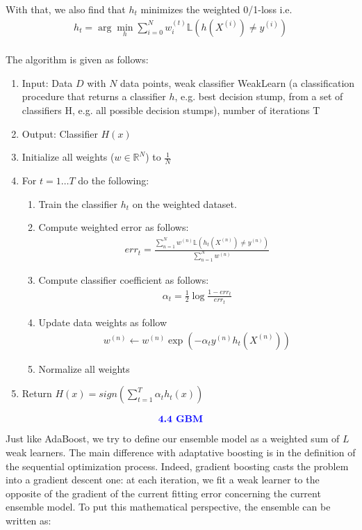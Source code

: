 \documentclass{homework}
\begin{document}
 With that, we also find that $h_t$ minimizes the weighted 0/1-loss i.e.
 \begin{align*}
    h_t = \arg \min_{h} \sum_{i=0}^{N} w^{(t)}_i \mathbb{L}(h(X^{(i)}) \neq y^{(i)})
 \end{align*}
 \\
The algorithm is given as follows:
\begin{enumerate}
    \item Input: Data $D$ with $N$ data points, weak classifier WeakLearn (a classification procedure that
    returns a classifier $h$, e.g. best decision stump, from a set of classifiers H, e.g.
    all possible decision stumps), number of iterations T
    \item Output: Classifier $H(x)$
    \item Initialize all weights ($w \in \mathbb{R}^N$) to $\frac{1}{N}$
    \item For $t = 1\dots T$ do the following:
        \begin{enumerate}
            \item Train the classifier $h_t$ on the weighted dataset.
            \item Compute weighted error as follows:
                \begin{align*}
                    err_t = \frac{\sum_{n=1}^{N}w^{(n)}\mathbb{L}(h_t(X^{(n)}) \neq y^{(n)})}{\sum_{n=1}^{N}w^{(n)}}
                \end{align*}
            \item Compute classifier coefficient as follows:
                \begin{align*}
                    \alpha_t = \frac{1}{2} \log \frac{1 - err_t}{err_t}
                \end{align*}
            \item Update data weights as follow 
                \begin{align*}
                    w^{(n)} \leftarrow w^{(n)} \exp(-\alpha_t y^{(n)}h_t(X^{(n)}))
                \end{align*}
            \item Normalize all weights
        \end{enumerate}
    \item Return $H(x) = sign(\sum_{t=1}^{T} \alpha_t h_t(x))$
\end{enumerate}
\begin{align*}
    \textcolor{blue}{ \text{{\textbf{4.4 GBM}}}}
 \end{align*}
 Just like AdaBoost, we try to define our ensemble model as a weighted sum of $L$ weak learners. The main difference with adaptative boosting is in the definition of the sequential optimization process. Indeed, gradient boosting casts the problem into a gradient descent one: at each iteration, we fit a weak learner to the opposite of the gradient of the current fitting error concerning the current ensemble model. To put this mathematical perspective, the ensemble can be written as:
\end{document}
